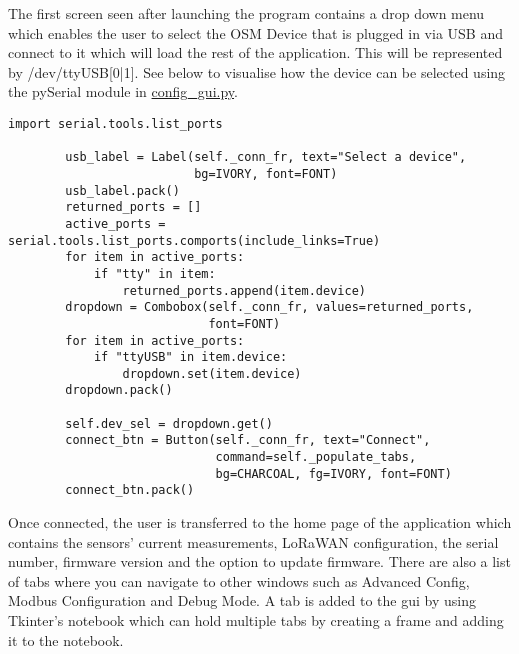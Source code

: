 \documentclass[a4paper,12pt, notitlepage]{article}
\begin{document}
The first screen seen after launching the program contains a drop down menu which enables the user to select the OSM Device that is plugged in via USB and connect to it which will load the rest of the application. This will be represented by /dev/ttyUSB[0|1]. See below to visualise how the device can be selected using the pySerial module in \url{config_gui.py}. 
\begin{lstlisting}[caption={A simple function to set the OSM as the selected device},label={lst: exampWindow}]
import serial.tools.list_ports

        usb_label = Label(self._conn_fr, text="Select a device",
                          bg=IVORY, font=FONT)
        usb_label.pack()
        returned_ports = []
        active_ports = serial.tools.list_ports.comports(include_links=True)
        for item in active_ports:
            if "tty" in item:
                returned_ports.append(item.device)
        dropdown = Combobox(self._conn_fr, values=returned_ports,
                            font=FONT)
        for item in active_ports:
            if "ttyUSB" in item.device:
                dropdown.set(item.device)
        dropdown.pack()

        self.dev_sel = dropdown.get()
        connect_btn = Button(self._conn_fr, text="Connect",
                             command=self._populate_tabs,
                             bg=CHARCOAL, fg=IVORY, font=FONT)
        connect_btn.pack()

\end{lstlisting}

Once connected, the user is transferred to the home page of the application which contains the sensors' current measurements, LoRaWAN configuration, the serial number, firmware version and the option to update firmware. There are also a list of tabs where you can navigate to other windows such as Advanced Config, Modbus Configuration and Debug Mode. A tab is added to the gui by using Tkinter's notebook which can hold multiple tabs by creating a frame and adding it to the notebook.
\end{document}

